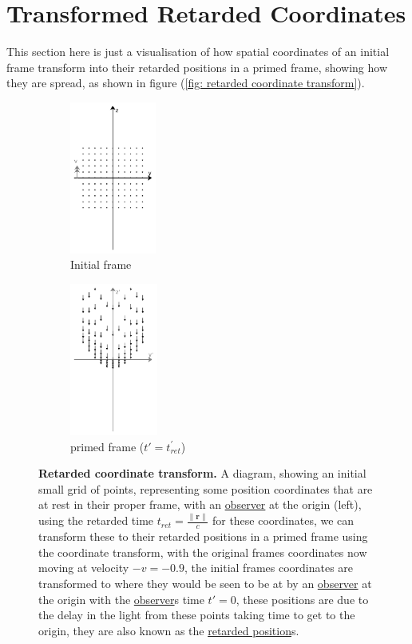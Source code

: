 \section{Transformed Retarded Coordinates} \label{sect: Delayed View of Transformed Coordinates}

This section here is just a visualisation of how spatial coordinates of an initial frame transform into their retarded positions in a primed frame, showing how they are spread, as shown in figure (\ref{fig: retarded coordinate transform}).

\begin{figure}[H]
	\centering
	\begin{subfigure}{0.45\textwidth}
		\centering
		\includegraphics[height=5cm]{images/pdf/coord_transform_initial_with_retarded_time.pdf}
		\caption{Initial frame}
		\label{fig: retarded coordinate transform subfig_1}
	\end{subfigure}
	\begin{subfigure}{0.45\textwidth}
		\centering
		\includegraphics[height=5cm]{images/pdf/coord_transform_primed_retarded.pdf}
		\caption{primed frame (${t{'}}={t_{ret}^{'}}$)}
		\label{fig: retarded coordinate transform subfig_2}
	\end{subfigure}
	\caption{\textbf{Retarded coordinate transform.} A diagram, showing an initial small grid of points, representing some position coordinates that are at rest in their proper frame, with an \protect\hyperlink{def-observer}{observer} at the origin (left), using the retarded time ${t_{ret}} = \frac{\|\mathbf{r}\|}{c}$ for these coordinates, we can transform these to their retarded positions in a primed frame using the coordinate transform, with the original frames coordinates now moving at velocity $-{v} =-0.9$, the initial frames coordinates are transformed to where they would be seen to be at by an \protect\hyperlink{def-observer}{observer} at the origin with the \protect\hyperlink{def-observer}{observer}s time ${t{'}} = 0$, these positions are due to the delay in the light from these points taking time to get to the origin, they are also known as the \protect\hyperlink{def-retarded-position}{retarded position}s.}

\end{figure}
